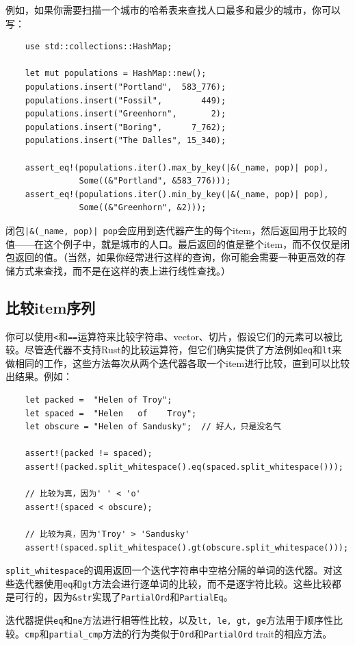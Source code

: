 例如，如果你需要扫描一个城市的哈希表来查找人口最多和最少的城市，你可以写：
\begin{verbatim}
    use std::collections::HashMap;

    let mut populations = HashMap::new();
    populations.insert("Portland",  583_776);
    populations.insert("Fossil",        449);
    populations.insert("Greenhorn",       2);
    populations.insert("Boring",      7_762);
    populations.insert("The Dalles", 15_340);

    assert_eq!(populations.iter().max_by_key(|&(_name, pop)| pop),
               Some((&"Portland", &583_776)));
    assert_eq!(populations.iter().min_by_key(|&(_name, pop)| pop),
               Some((&"Greenhorn", &2)));
\end{verbatim}

闭包\texttt{|\&(\_name, pop)| pop}会应用到迭代器产生的每个item，然后返回用于比较的值——在这个例子中，就是城市的人口。最后返回的值是整个item，而不仅仅是闭包返回的值。（当然，如果你经常进行这样的查询，你可能会需要一种更高效的存储方式来查找，而不是在这样的表上进行线性查找。）

\subsection{比较item序列}
你可以使用\texttt{<}和\texttt{==}运算符来比较字符串、vector、切片，假设它们的元素可以被比较。尽管迭代器不支持Rust的比较运算符，但它们确实提供了方法例如\texttt{eq}和\texttt{lt}来做相同的工作，这些方法每次从两个迭代器各取一个item进行比较，直到可以比较出结果。例如：
\begin{verbatim}
    let packed =  "Helen of Troy";
    let spaced =  "Helen   of    Troy";
    let obscure = "Helen of Sandusky";  // 好人，只是没名气

    assert!(packed != spaced);
    assert!(packed.split_whitespace().eq(spaced.split_whitespace()));

    // 比较为真，因为' ' < 'o'
    assert!(spaced < obscure);

    // 比较为真，因为'Troy' > 'Sandusky'
    assert!(spaced.split_whitespace().gt(obscure.split_whitespace()));
\end{verbatim}

\texttt{split\_whitespace}的调用返回一个迭代字符串中空格分隔的单词的迭代器。对这些迭代器使用\texttt{eq}和\texttt{gt}方法会进行逐单词的比较，而不是逐字符比较。这些比较都是可行的，因为\texttt{\&str}实现了\texttt{PartialOrd}和\texttt{PartialEq}。

迭代器提供\texttt{eq}和\texttt{ne}方法进行相等性比较，以及\texttt{lt, le, gt, ge}方法用于顺序性比较。\texttt{cmp}和\texttt{partial\_cmp}方法的行为类似于\texttt{Ord}和\texttt{PartialOrd} trait的相应方法。

